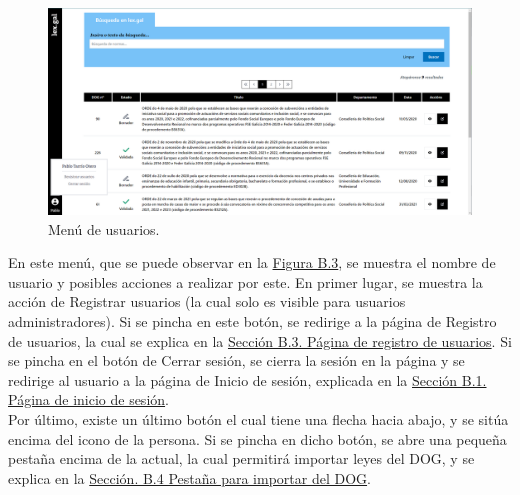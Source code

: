 \begin{figure}[H]
\centerline{\includegraphics[width=15cm]{figuras/manualUsuario/OpcionesUsuario.PNG}}
\caption{Menú de usuarios.}
\label{enlacePMenuUsuarios}
\end{figure}

En este menú, que se puede observar en la \hyperref[enlacePMenuUsuarios]{Figura B.3}, se muestra el nombre de usuario y posibles acciones a realizar por este. En primer lugar, se muestra la acción de Registrar usuarios (la cual solo es visible para usuarios administradores). Si se pincha en este botón, se redirige a la página de Registro de usuarios, la cual se explica en la \hyperref[PInicioSesion]{Sección B.3. Página de registro de usuarios}. Si se pincha en el botón de Cerrar sesión, se cierra la sesión en la página y se redirige al usuario a la página de Inicio de sesión, explicada en la \hyperref[PInicioSesion]{Sección B.1. Página de inicio de sesión}.
\\

Por último, existe un último botón el cual tiene una flecha hacia abajo, y se sitúa encima del icono de la persona. Si se pincha en dicho botón, se abre una pequeña pestaña encima de la actual, la cual permitirá importar leyes del DOG, y se explica en la \hyperref[PBusquedaDOG]{Sección. B.4 Pestaña para importar del DOG}.